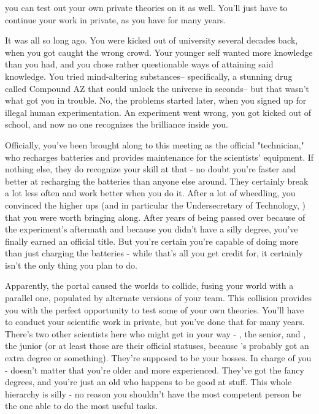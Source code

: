 \documentclass[char]{guildcamp3}
\begin{document}
 you can test out your own private theories on it as well. You'll just have to continue your work in private, as you have for many years. 

\name{\cTech{}}

It was all so long ago. You were kicked out of university several decades back, when you got caught the wrong crowd. Your younger self wanted more knowledge than you had, and you chose rather questionable ways of attaining said knowledge. You tried mind-altering substances-- specifically, a stunning drug called Compound AZ that could unlock the universe in seconds-- but that wasn't what got you in trouble. No, the problems started later, when you signed up for illegal human experimentation. An experiment went wrong, you got kicked out of school, and now no one recognizes the brilliance inside you.

Officially, you've been brought along to this meeting as the official "technician," who recharges batteries and provides maintenance for the scientists' equipment. If nothing else, they do recognize your skill at that - no doubt you're faster and better at recharging the batteries than anyone else around. They certainly break a lot less often and work better when you do it. After a lot of wheedling, you convinced the higher ups (and in particular the Undersecretary of Technology, \cPoliTwo{\intro}) that you were worth bringing along. After years of being passed over because of the experiment's aftermath and because you didn't have a silly degree, you've finally earned an official title. But you're certain you're capable of doing more than just charging the batteries - while that's all you get credit for, it certainly isn't the only thing you plan to do. 

Apparently, the portal caused the worlds to collide, fusing your world with a parallel one, populated by alternate versions of your team. This collision provides you with the perfect opportunity to test some of your own theories. You'll have to conduct your scientific work in private, but you've done that for many years. There's two other scientists here who might get in your way - \cSciOne{\intro}, the senior, and \cSciTwo{\intro}, the junior (or at least those are their official statuses, because \cSciOne{}'s probably got an extra degree or something). They're supposed to be your bosses. In charge of you - doesn't matter that you're older and more experienced. They've got the fancy degrees, and you're just an old \cTech{\human} who happens to be good at stuff. This whole hierarchy is silly - no reason you shouldn't have the most competent person be the one able to do the most useful tasks. 
\end{document}
